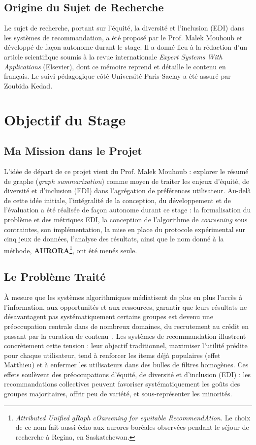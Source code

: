 \documentclass[12pt]{report}
\begin{document}
\section{Origine du Sujet de Recherche}

Le sujet de recherche, portant sur l'équité, la diversité et
l'inclusion (EDI) dans les systèmes de recommandation, a été proposé
par le Prof. Malek Mouhoub et développé de façon autonome durant le
stage. Il a donné lieu à la rédaction d'un article scientifique soumis
à la revue internationale \emph{Expert Systems With Applications}
(Elsevier), dont ce mémoire reprend et détaille le contenu en
français. Le suivi
pédagogique côté Université Paris-Saclay a été assuré par Zoubida
Kedad.

\chapter{Objectif du Stage}
\label{chap:objectif}

\section{Ma Mission dans le Projet}

L'idée de départ de ce projet vient du Prof. Malek Mouhoub : explorer le
résumé de graphe (\emph{graph summarization}) comme moyen de traiter les
enjeux d'équité, de diversité et d'inclusion (EDI) dans l'agrégation de
préférences utilisateur. Au-delà de cette idée initiale, l'intégralité de
la conception, du développement et de l'évaluation a été réalisée de
façon autonome durant ce stage : la formalisation du problème et des
métriques EDI, la conception de l'algorithme de \emph{coarsening} sous
contraintes, son implémentation, la mise en place du protocole
expérimental sur cinq jeux de données, l'analyse des résultats, ainsi que
le nom donné à la méthode, \textbf{AURORA}\footnote{\emph{Attributed
Unified gRaph cOarsening for equitable RecommendAtion.} Le choix de ce
nom fait aussi écho aux aurores boréales observées pendant le séjour de
recherche à Regina, en Saskatchewan.}, ont été menés seule.

\section{Le Problème Traité}

À mesure que les systèmes algorithmiques médiatisent de plus en plus
l'accès à l'information, aux opportunités et aux ressources, garantir que
leurs résultats ne désavantagent pas systématiquement certains groupes
est devenu une préoccupation centrale dans de nombreux domaines, du
recrutement au crédit en passant par la curation de
contenu~\cite{mehrabi2021survey}. Les
systèmes de recommandation illustrent concrètement cette tension : leur
objectif traditionnel, maximiser l'utilité prédite pour chaque
utilisateur, tend à renforcer les items déjà populaires (effet Matthieu)
et à enfermer les utilisateurs dans des bulles de filtres homogènes. Ces
effets soulèvent des préoccupations d'équité, de diversité et d'inclusion
(EDI) : les recommandations collectives peuvent favoriser
systématiquement les goûts des groupes majoritaires, offrir peu de
variété, et sous-représenter les minorités.
\end{document}
